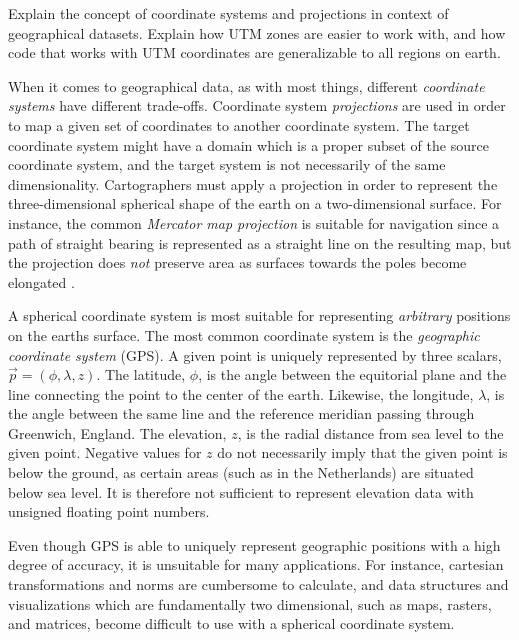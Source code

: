 \begin{sectionsummary}
  Explain the concept of coordinate systems and projections in context of geographical datasets.
  Explain how UTM zones are easier to work with, and how code that works with UTM coordinates
  are generalizable to all regions on earth.
\end{sectionsummary}

When it comes to geographical data, as with most things, different \textit{coordinate systems} have different trade-offs.
Coordinate system \textit{projections} are used in order to map a given set of coordinates to another coordinate system.
The target coordinate system might have a domain which is a proper subset of the source coordinate system, and the target system is not necessarily of the same dimensionality.
Cartographers must apply a projection in order to represent the three-dimensional spherical shape of the earth on a two-dimensional surface.
For instance, the common \textit{Mercator map projection} is suitable for navigation since a path of straight bearing is represented as a straight line on the resulting map, but the projection does \textit{not} preserve area as surfaces towards the poles become elongated \cite[p.~38]{map_projections_1987}.

A spherical coordinate system is most suitable for representing \textit{arbitrary} positions on the earths surface.
The most common coordinate system is the \textit{geographic coordinate system} (GPS).
A given point is uniquely represented by three scalars, $\vec{p} = (\phi, \lambda, z)$.
The latitude, $\phi$, is the angle between the equitorial plane and the line connecting the point to the center of the earth.
Likewise, the longitude, $\lambda$, is the angle between the same line and the reference meridian passing through Greenwich, England.
The elevation, $z$, is the radial distance from sea level to the given point.
Negative values for $z$ do not necessarily imply that the given point is below the ground, as certain areas (such as in the Netherlands) are situated below sea level.
It is therefore not sufficient to represent elevation data with unsigned floating point numbers.

Even though GPS is able to uniquely represent geographic positions with a high degree of accuracy, it is unsuitable for many applications.
For instance, cartesian transformations and norms are cumbersome to calculate, and data structures and visualizations which are fundamentally two dimensional, such as maps, rasters, and matrices, become difficult to use with a spherical coordinate system.


